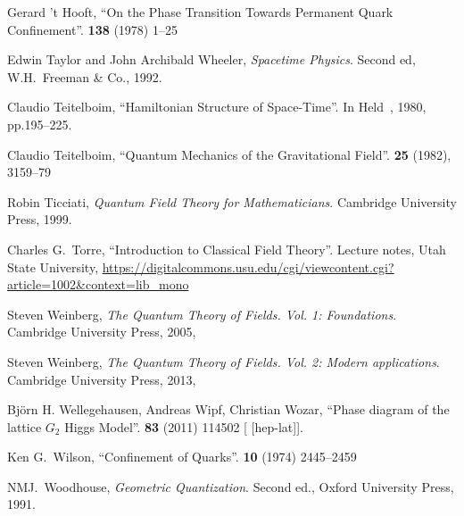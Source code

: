\begin{thebibliography}{99}
Gerard 't Hooft,
``On the Phase Transition Towards Permanent Quark Confinement''.
 \textbf{138} (1978) 1--25
{\tt{}}

Edwin Taylor and John Archibald Wheeler,
\textit{Spacetime Physics}.
Second ed, W.H.~Freeman \& Co., 1992.

Claudio Teitelboim,
``Hamiltonian Structure of Space-Time''.
In Held~\cite{Held:1980gb}, 1980, pp.195--225.

Claudio Teitelboim,
``Quantum Mechanics of the Gravitational Field''.
 \textbf{25} (1982), 3159--79
{\tt{}}

Robin Ticciati,
\textit{Quantum Field Theory for Mathematicians}.
Cambridge University Press, 1999.

Charles G.~Torre,
``Introduction to Classical Field Theory''.
Lecture notes, Utah State University,
\url{https://digitalcommons.usu.edu/cgi/viewcontent.cgi?article=1002&context=lib_mono}





Steven Weinberg,
\textit{The Quantum Theory of Fields. Vol. 1: Foundations}.
Cambridge University Press, 2005,
{\tt{}}

Steven Weinberg,
\textit{The Quantum Theory of Fields. Vol. 2: Modern applications}.
Cambridge University Press, 2013,
{\tt{}}

Bj\"{o}rn H. Wellegehausen, Andreas Wipf, Christian Wozar,
``Phase diagram of the lattice $G_2$ Higgs Model''.
 \textbf{83} (2011) 114502
{\tt{}}
[ [hep-lat]].

Ken G.~Wilson,
``Confinement of Quarks''.
 \textbf{10} (1974) 2445--2459
{\tt{}}

NMJ.~Woodhouse,
\textit{Geometric Quantization}.
Second ed., Oxford University Press, 1991.

\end{thebibliography}

